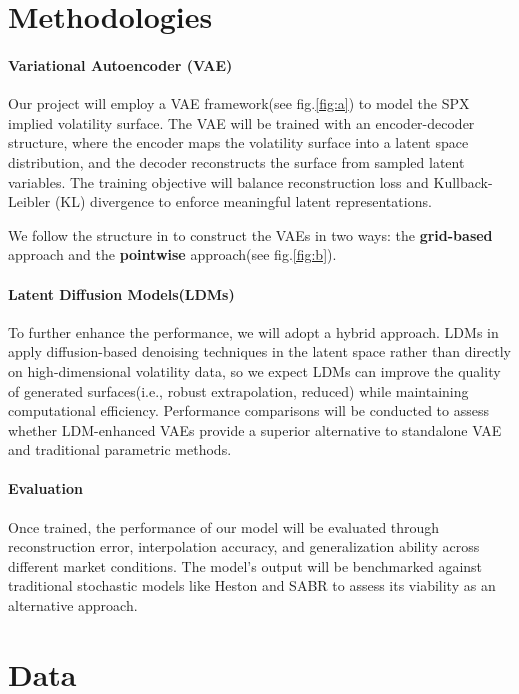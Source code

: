 \documentclass{article}
\begin{document}
\section{Methodologies}
\paragraph{Variational Autoencoder (VAE)}
Our project will employ a VAE framework(see fig.\ref{fig:a}) to model the SPX implied volatility surface. The VAE will be trained with an encoder-decoder structure, where the encoder maps the volatility surface into a latent space distribution, and the decoder reconstructs the surface from sampled latent variables. The training objective will balance reconstruction loss and Kullback-Leibler (KL) divergence to enforce meaningful latent representations.

We follow the structure in \cite{vaeorigin} to construct the VAEs in two ways: the \textbf{grid-based} approach and the \textbf{pointwise} approach(see fig.\ref{fig:b}).

\paragraph{Latent Diffusion Models(LDMs)}
To further enhance the performance, we will adopt a hybrid approach. LDMs in \cite{rombach2022highresolutionimagesynthesislatent} apply diffusion-based denoising techniques in the latent space rather than directly on high-dimensional volatility data, so we expect LDMs can  improve the quality of generated surfaces(i.e., robust extrapolation, reduced) while maintaining computational efficiency. Performance comparisons will be conducted to assess whether LDM-enhanced VAEs provide a superior alternative to standalone VAE and traditional parametric methods.



\paragraph{Evaluation} Once trained, the performance of our model will be evaluated through reconstruction error, interpolation accuracy, and generalization ability across different market conditions. The model’s output will be benchmarked against traditional stochastic models like Heston \cite{wolfram_volsurface_heston} and SABR \cite{wolfram_volsurface_sabr} to assess its viability as an alternative approach.

\section{Data}
\end{document}
